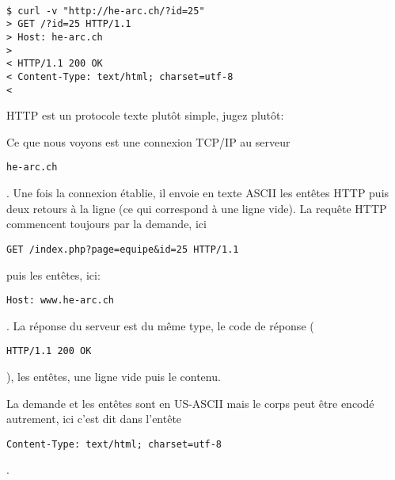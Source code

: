 \begin{otherlanguage}{english}

\begin{verbatim}

$ curl -v "http://he-arc.ch/?id=25"
> GET /?id=25 HTTP/1.1
> Host: he-arc.ch
>
< HTTP/1.1 200 OK
< Content-Type: text/html; charset=utf-8
<
\end{verbatim}

\end{otherlanguage}

\begin{otherlanguage}{english}

\begin{Shaded}
\begin{Highlighting}[]
\DataTypeTok{>}
\end{Highlighting}
\end{Shaded}

\end{otherlanguage}

HTTP est un protocole texte plutôt simple, jugez plutôt:

Ce que nous voyons est une connexion TCP/IP au serveur
\begin{otherlanguage}{english}\texttt{he-arc.ch}\end{otherlanguage}. Une
fois la connexion établie, il envoie en texte ASCII les entêtes HTTP
puis deux retours à la ligne (ce qui correspond à une ligne vide). La
requête HTTP commencent toujours par la demande, ici
\begin{otherlanguage}{english}\texttt{GET\ /index.php?page=equipe\&id=25\ HTTP/1.1}\end{otherlanguage}
puis les entêtes, ici:
\begin{otherlanguage}{english}\texttt{Host:\ www.he-arc.ch}\end{otherlanguage}.
La réponse du serveur est du même type, le code de réponse
(\begin{otherlanguage}{english}\texttt{HTTP/1.1\ 200\ OK}\end{otherlanguage}),
les entêtes, une ligne vide puis le contenu.

La demande et les entêtes sont en US-ASCII mais le corps peut être
encodé autrement, ici c'est dit dans l'entête
\begin{otherlanguage}{english}\texttt{Content-Type:\ text/html;\ charset=utf-8}\end{otherlanguage}.

